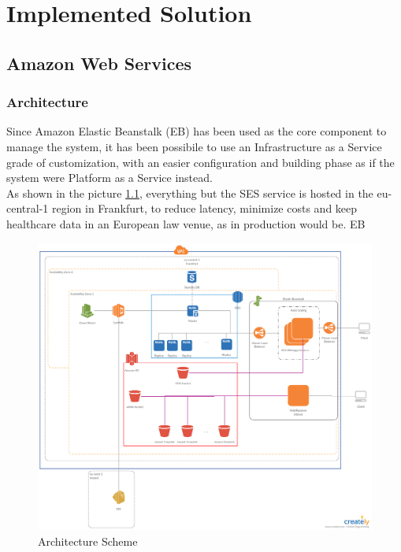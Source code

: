 \chapter{Implemented Solution}
\section{Amazon Web Services}

\subsection{Architecture}
Since Amazon Elastic Beanstalk (EB) has been used as the core component to manage the system, it has been possibile to use an Infrastructure as a Service grade of customization, with an easier configuration and building phase as if the system were Platform as a Service instead.\\
As shown in the picture \ref{fig:architecture}, everything but the SES service is hosted in the eu-central-1 region in Frankfurt, to reduce latency, minimize costs and keep healthcare data in an European law venue, as in production would be.
EB 

\begin{figure}[h]
    \includegraphics[width=\textwidth]{architecture}
    \caption{Architecture Scheme}
    \label{fig:architecture}
\end{figure}
